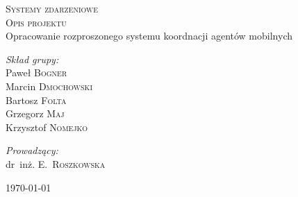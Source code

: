 \begin{titlepage}
  \begin{center}
    

    \textsc{\Large Systemy zdarzeniowe}\\[3cm]
    
    \centering{\HRule \\[0.5cm]}
	      {\LARGE  \textsc{Opis projektu}\\[0.4cm]}
	      {\Large Opracowanie rozproszonego systemu koordnacji
                agentów mobilnych}
	      \centering{\HRule \\[1.5cm]}
	      
	      \begin{minipage}{0.4\textwidth}
	        \begin{flushleft} \large
	          \emph{Skład grupy:}\\
	          Paweł \textsc{Bogner} \\
	          Marcin \textsc{Dmochowski} \\
	          Bartosz \textsc{Folta} \\	
	          Grzegorz \textsc{Maj} \\
	          Krzysztof \textsc{Nomejko} \\
		  
		  
	        \end{flushleft}
	      \end{minipage}
	      \begin{minipage}[b]{0.4\textwidth}
	        \begin{flushright} \large
		  \emph{Prowadzący:} \\
		  dr~inż. E.~\textsc{Roszkowska}
	        \end{flushright}

	      \end{minipage}
	      \vfill
	          {\large \today}

  \end{center}
\end{titlepage}
